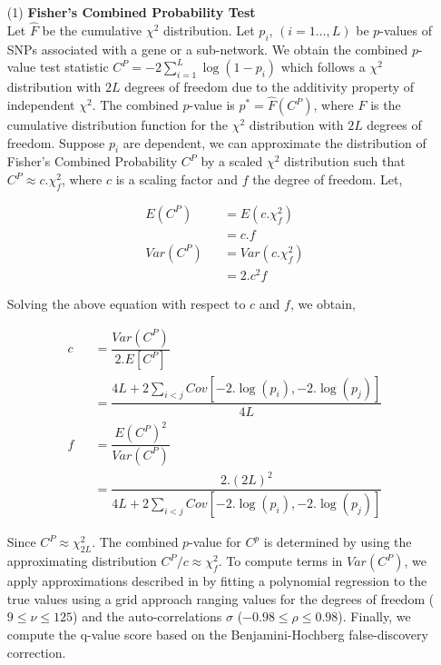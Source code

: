 \documentclass[10pt]{article}
\begin{document}
\begin{itemize}
\item [(1)] \textbf{ Fisher’s Combined Probability Test}\\

Let $\hat F$ be the cumulative $\chi^{2}$ distribution. Let $p_{i}$, $\left(i = 1 \ldots,L\right)$ be $p$-values of SNPs associated with a gene or a sub-network. We obtain the combined $p$-value test statistic \cite{fish,hess} $ C^{P} = -2 \sum_{i=1}^{L} \log (1 - p_{i})$ which follows a $\chi^{2}$ distribution with $2L$ degrees of freedom due to the additivity property of independent $\chi^{2}$. The combined $p$-value is $p^{*} = \hat F (C^{P})$, where $\hat F$ is the cumulative distribution function for the $\chi^{2}$ distribution with $2L$ degrees of freedom. Suppose $p_{i}$ are dependent, we can approximate the distribution of Fisher's Combined Probability $C^{P}$ by a scaled $\chi^{2}$ distribution such that $C^{P}\approx c.\chi^{2}_{f}$, where $c$ is a scaling factor and $f$ the degree of freedom. Let,

\setlength\arraycolsep{2pt}
\begin{eqnarray}
E(C^{P}) &&= E(c.\chi^{2}_{f})  \nonumber\\[2pt]
&&= c.f \nonumber \\[2pt]
Var(C^{P}) &&= Var(c.\chi^{2}_{f}) \nonumber\\[2pt]
&&= 2.c^{2}f \nonumber
\end{eqnarray}

Solving the above equation with respect to $c$ and $f$, we obtain,

\setlength\arraycolsep{2pt}
\begin{eqnarray}
c &&= \dfrac{Var(C^{P})}{2.E[C^{P}]}  \nonumber\\[2pt]
&&= \dfrac{4L + 2\sum_{i<j}Cov[-2.\log(p_{i}),-2.\log(p_{j})]}{4L} \nonumber\\[2pt]
f &&= \dfrac{E(C^{P})^{2}}{Var(C^{P})} \nonumber\\[2pt]
&&= \dfrac{2.(2L)^{2}}{4L+2\sum_{i<j}Cov[-2.\log(p_{i}),-2.\log(p_{j})]} \nonumber
\end{eqnarray}

Since $C^{P} \approx \chi^{2}_{2L}$. The combined $p$-value for $C^{p}$ is determined by using the approximating distribution $C^{P}/c \approx \chi^{2}_{f}$. To compute terms in $Var(C^{P})$, we apply approximations described in \cite{kost} by fitting a polynomial regression to the true values using a grid approach ranging values for the degrees of freedom ($9 \leq \nu \leq 125$) and the auto-correlations $\sigma$ ($-0.98 \leq \rho \leq 0.98$). Finally, we compute the q-value score based on the Benjamini-Hochberg false-discovery \cite{benj} correction.


\end{itemize}
\end{document}
